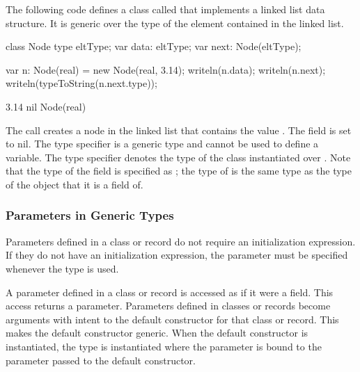 \begin{example}
The following code defines a class called  that implements
a linked list data structure.  It is generic over the type of the
element contained in the linked list.
\begin{chapelpre}
\end{chapelpre}
\begin{chapel}
class Node {
  type eltType;
  var data: eltType;
  var next: Node(eltType);
}
\end{chapel}
\begin{chapelpost}
var n: Node(real) = new Node(real, 3.14);
writeln(n.data);
writeln(n.next);
writeln(typeToString(n.next.type));
\end{chapelpost}
\begin{chapeloutput}
3.14
nil
Node(real)
\end{chapeloutput}
The call  creates a node in the linked list
that contains the value .  The  field is set to
nil.  The type specifier  is a generic type and cannot be
used to define a variable.  The type specifier 
denotes the type of the  class instantiated over
.  Note that the type of the  field is specified
as ; the type of  is the same type as
the type of the object that it is a field of.
\end{example}

\subsubsection{Parameters in Generic Types}
\label{Parameters_in_Generic_Types}

Parameters defined in a class or record do not require an
initialization expression.  If they do not have an initialization
expression, the parameter must be specified whenever the type is used.

A parameter defined in a class or record is accessed as if it were a
field.  This access returns a parameter.  Parameters defined in
classes or records become arguments with intent  to the
default constructor for that class or record.  This makes the default
constructor generic.  When the default constructor is instantiated,
the type is instantiated where the parameter is bound to the parameter
passed to the default constructor.

